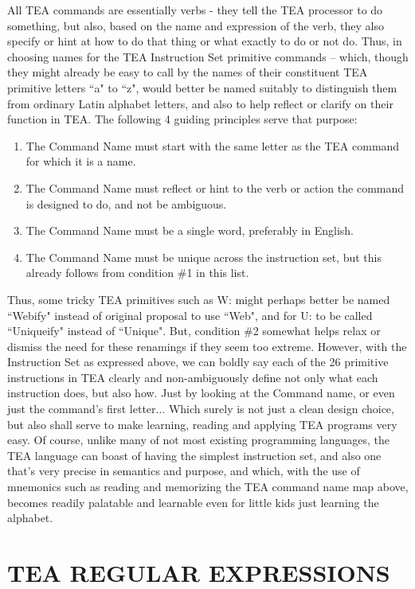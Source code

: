 \documentclass[a4paper, 18pt]{book} %
\begin{document}
All TEA commands are essentially verbs - they tell the TEA processor to do something, but also, based on the name and expression of the verb, they also specify or hint at how to do that thing or what exactly to do or not do. Thus, in choosing names for the TEA Instruction Set primitive commands – which, though they might already be easy to call by the names of their constituent TEA primitive letters ``a" to ``z", would better be named suitably to distinguish them from ordinary Latin alphabet letters, and also to help reflect or clarify on their function in TEA. The following 4 guiding principles serve that purpose:


\begin{enumerate}
\item The Command Name must start with the same letter as the TEA command for which it is a name.
\item The Command Name must reflect or hint to the verb or action the command is designed to do, and not be ambiguous.
\item The Command Name must be a single word, preferably in English.
\item The Command Name must be unique across the instruction set, but this already follows from condition \#1 in this list.
\end{enumerate}

Thus, some tricky TEA primitives such as W: might perhaps better be named ``Webify" instead of original proposal to use ``Web", and for U: to be called ``Uniqueify" instead of ``Unique". But, condition \#2 somewhat helps relax or dismiss the need for these renamings if they seem too extreme. However, with the Instruction Set as expressed above, we can boldly say each of the 26 primitive instructions in TEA clearly and non-ambiguously define not only what each instruction does, but also how. Just by looking at the Command name, or even just the command's first letter... Which surely is not just a clean design choice, but also shall serve to make learning, reading and applying TEA programs very easy. Of course, unlike many of not most existing programming languages, the TEA language can boast of having the simplest instruction set, and also one that's very precise in semantics and purpose, and which, with the use of mnemonics such as reading and memorizing the TEA command name map above, becomes readily palatable and learnable even for little kids just learning the alphabet.

\chapter{TEA REGULAR EXPRESSIONS}
\label{SECREGEXP}
\end{document}
